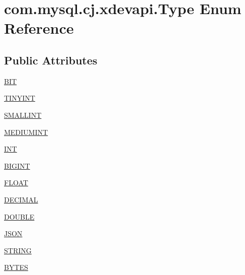 \hypertarget{enumcom_1_1mysql_1_1cj_1_1xdevapi_1_1_type}{}\section{com.\+mysql.\+cj.\+xdevapi.\+Type Enum Reference}
\label{enumcom_1_1mysql_1_1cj_1_1xdevapi_1_1_type}
\subsection*{Public Attributes}
\begin{DoxyCompactItemize}
\item 
\mbox{\hyperlink{enumcom_1_1mysql_1_1cj_1_1xdevapi_1_1_type_a8f14a97660638252f65e42167d357250}{B\+IT}}
\item 
\mbox{\hyperlink{enumcom_1_1mysql_1_1cj_1_1xdevapi_1_1_type_abb7980c75b380fb05b922cb692e1716d}{T\+I\+N\+Y\+I\+NT}}
\item 
\mbox{\hyperlink{enumcom_1_1mysql_1_1cj_1_1xdevapi_1_1_type_aa3075184cee0b8cdb200b773bce4ff77}{S\+M\+A\+L\+L\+I\+NT}}
\item 
\mbox{\hyperlink{enumcom_1_1mysql_1_1cj_1_1xdevapi_1_1_type_a23e999ebe44e82e6ba5c38d9c9991f8c}{M\+E\+D\+I\+U\+M\+I\+NT}}
\item 
\mbox{\hyperlink{enumcom_1_1mysql_1_1cj_1_1xdevapi_1_1_type_a4df36f1739a4a43fba1f06dbde494390}{I\+NT}}
\item 
\mbox{\hyperlink{enumcom_1_1mysql_1_1cj_1_1xdevapi_1_1_type_a2d52786ebe465aa72338f620f0010f61}{B\+I\+G\+I\+NT}}
\item 
\mbox{\hyperlink{enumcom_1_1mysql_1_1cj_1_1xdevapi_1_1_type_a74c8f06cf55f7b0017d3ea65de135e02}{F\+L\+O\+AT}}
\item 
\mbox{\hyperlink{enumcom_1_1mysql_1_1cj_1_1xdevapi_1_1_type_af635e2741a3c8e3eab7cfeb06e64669e}{D\+E\+C\+I\+M\+AL}}
\item 
\mbox{\hyperlink{enumcom_1_1mysql_1_1cj_1_1xdevapi_1_1_type_a5002ae30d79b4a18b2311f95f83c7f07}{D\+O\+U\+B\+LE}}
\item 
\mbox{\hyperlink{enumcom_1_1mysql_1_1cj_1_1xdevapi_1_1_type_a64b8b33d18409ead229841bc9195e653}{J\+S\+ON}}
\item 
\mbox{\hyperlink{enumcom_1_1mysql_1_1cj_1_1xdevapi_1_1_type_a0749d7b4880cbccca7e951b7ffdc5f4b}{S\+T\+R\+I\+NG}}
\item 
\mbox{\hyperlink{enumcom_1_1mysql_1_1cj_1_1xdevapi_1_1_type_a945339018df1b7ba556def7fcd71f2d3}{B\+Y\+T\+ES}}
\item 

\end{DoxyCompactItemize}

